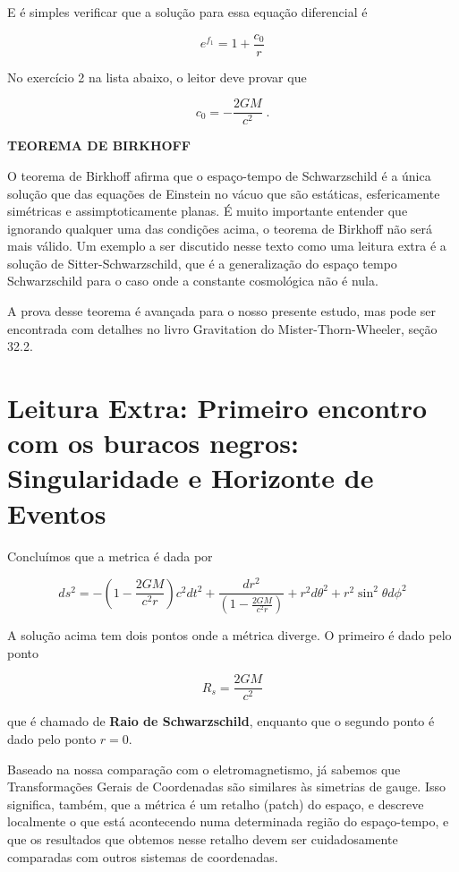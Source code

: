 \documentclass[11pt]{article}
\begin{document}
    E é simples verificar que a solução para essa equação diferencial é

\[ \tag{4.10} e^{f_1} = 1 + \frac{c_0}{r} \]

No exercício 2 na lista abaixo, o leitor deve provar que

\[ \tag{4.11} c_0 = - \frac{2 G M}{c^2}\; . \]

    \textbf{TEOREMA DE BIRKHOFF}

O teorema de Birkhoff afirma que o espaço-tempo de Schwarzschild é a
única solução que das equações de Einstein no vácuo que são estáticas,
esfericamente simétricas e assimptoticamente planas. É muito importante
entender que ignorando qualquer uma das condições acima, o teorema de
Birkhoff não será mais válido. Um exemplo a ser discutido nesse texto
como uma leitura extra é a solução de Sitter-Schwarzschild, que é a
generalização do espaço tempo Schwarzschild para o caso onde a constante
cosmológica não é nula.

A prova desse teorema é avançada para o nosso presente estudo, mas pode
ser encontrada com detalhes no livro Gravitation do
Mister-Thorn-Wheeler, seção 32.2.

    \hypertarget{leitura-extra-primeiro-encontro-com-os-buracos-negros-singularidade-e-horizonte-de-eventos}{%
\section{Leitura Extra: Primeiro encontro com os buracos negros:
Singularidade e Horizonte de
Eventos}\label{leitura-extra-primeiro-encontro-com-os-buracos-negros-singularidade-e-horizonte-de-eventos}}

    Concluímos que a metrica é dada por

\[ \tag{5.1} ds^2 = -\left(1 - \frac{2 G M}{c^2 r}\right) c^2 dt^2 + \frac{dr^2}{\left(1 - \frac{2 G M}{c^2 r}\right)} + r^2 d\theta^2 + r^2 \sin^2\theta d\phi^2 \]

    A solução acima tem dois pontos onde a métrica diverge. O primeiro é
dado pelo ponto

\[ \tag{5.2} R_s = \frac{2GM}{c^2}\]

que é chamado de \textbf{Raio de Schwarzschild}, enquanto que o segundo
ponto é dado pelo ponto \(r=0\).

    Baseado na nossa comparação com o eletromagnetismo, já sabemos que
Transformações Gerais de Coordenadas são similares às simetrias de
gauge. Isso significa, também, que a métrica é um retalho (patch) do
espaço, e descreve localmente o que está acontecendo numa determinada
região do espaço-tempo, e que os resultados que obtemos nesse retalho
devem ser cuidadosamente comparadas com outros sistemas de coordenadas.
\end{document}
